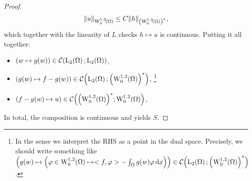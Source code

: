\documentclass{article}
\begin{document}
\begin{example}
\begin{proof}
		\[
			\norm{u}_{\WkpzeroSet[1][2]{\Omega}}\leq C \norm{h}_{\qty(\WkpzeroSet[1][2]{\Omega})^{*}},
		\]
		which together with the linearity of $L$ checks $h \mapsto u$ is continuous. Putting it all together:
		\begin{itemize}
			\item $\qty(w \mapsto g(w)) \in \mathcal{C}\qty(\LpSet[2]{\Omega};\LpSet[2]{\Omega})$,
			\item $\qty(g(w) \mapsto f - g(w))  \in \mathcal{C}\qty(\LpSet[2]{\Omega}; \qty(\WkpzeroSet[1][2]{\Omega})^{*})$, \footnote{In the sense we interpret the RHS as a point in the dual space. Precisely, we should write something like $\qty(g(w) \mapsto \qty(\varphi \in \WkpzeroSet[1][2]{\Omega} \mapsto <f,\varphi>-\int_{\Omega}g(w) \varphi\dd{x})) \in \mathcal{C}\qty(\LpSet[2]{\Omega}; \qty(\WkpzeroSet[1][2]{\Omega})^{*})$.} 
			\item $\qty(f - g(w) \mapsto u) \in \mathcal{C}\qty(\qty(\WkpzeroSet[1][2]{\Omega})^{*}; \WkpzeroSet[1][2]{\Omega})$, 
		\end{itemize}
		In total, the composition is continuous and yields $S$.


\end{proof}
\end{example}
\end{document}
